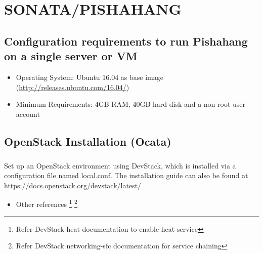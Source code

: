 \chapter{SONATA/PISHAHANG}
\label{ch:pishahang}

	\section{Configuration requirements to run Pishahang on a single server or VM}
	\label{sec:Configuration requirements to run Pishahang on a single server or VM}
	\begin{itemize}
		\item Operating System: Ubuntu 16.04 as base image (\hyperlink{name}{http://releases.ubuntu.com/16.04/})
		\item Minimum Requirements: 4GB RAM, 40GB hard disk and a non-root user account
	\end{itemize}
	
	
	\section{OpenStack Installation (Ocata)}
	\label{OpenStack Installation}
	\paragraph{}
	Set up an OpenStack environment using DevStack, which is installed via a configuration file named local.conf. The installation guide can also be found at\\ \hyperlink{name}{https://docs.openstack.org/devstack/latest/} 
	
	\begin{itemize}
		\item Other references 
		\footnote{Refer DevStack heat documentation to enable heat service}
		\footnote{Refer DevStack networking-sfc documentation for service chaining}
	\end{itemize}
	
